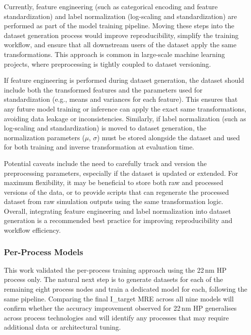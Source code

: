 \documentclass[10pt,twocolumn,letterpaper]{article}
\begin{document}
Currently, feature engineering (such as categorical encoding and feature standardization) and label normalization (log-scaling and standardization) are performed as part of the model training pipeline. Moving these steps into the dataset generation process would improve reproducibility, simplify the training workflow, and ensure that all downstream users of the dataset apply the same transformations. This approach is common in large-scale machine learning projects, where preprocessing is tightly coupled to dataset versioning.

If feature engineering is performed during dataset generation, the dataset should include both the transformed features and the parameters used for standardization (e.g., means and variances for each feature). This ensures that any future model training or inference can apply the exact same transformations, avoiding data leakage or inconsistencies. Similarly, if label normalization (such as log-scaling and standardization) is moved to dataset generation, the normalization parameters ($\mu$, $\sigma$) must be stored alongside the dataset and used for both training and inverse transformation at evaluation time.

Potential caveats include the need to carefully track and version the preprocessing parameters, especially if the dataset is updated or extended. For maximum flexibility, it may be beneficial to store both raw and processed versions of the data, or to provide scripts that can regenerate the processed dataset from raw simulation outputs using the same transformation logic. Overall, integrating feature engineering and label normalization into dataset generation is a recommended best practice for improving reproducibility and workflow efficiency.

\subsubsection{Per-Process Models}
\label{subsubsec:per_process_models}
\label{sec:fw_perprocess}

This work validated the per-process training approach using the 22\,nm HP process only. The natural next step is to generate datasets for each of the remaining eight process nodes and train a dedicated model for each, following the same pipeline. Comparing the final I\_target MRE across all nine models will confirm whether the accuracy improvement observed for 22\,nm HP generalises across process technologies and will identify any processes that may require additional data or architectural tuning.
\end{document}
